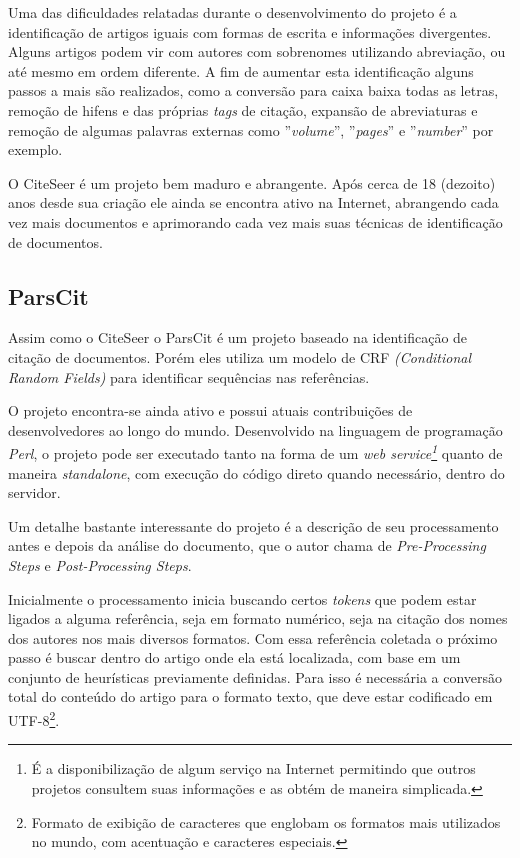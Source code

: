 Uma das dificuldades relatadas durante o desenvolvimento do projeto é a identificação de artigos iguais com formas de escrita e informações divergentes. Alguns artigos podem vir com autores com sobrenomes utilizando abreviação, ou até mesmo em ordem diferente. A fim de aumentar esta identificação alguns passos a mais são realizados, como a conversão para caixa baixa todas as letras, remoção de hifens e das próprias \textit{tags} de citação, expansão de abreviaturas e remoção de algumas palavras externas como ''\textit{volume}'', ''\textit{pages}'' e ''\textit{number}'' por exemplo.

O CiteSeer é um projeto bem maduro e abrangente. Após cerca de 18 (dezoito) anos desde sua criação ele ainda se encontra ativo na Internet, abrangendo cada vez mais documentos e aprimorando cada vez mais suas técnicas de identificação de documentos.

\subsection{ParsCit}
\label{ssec:parscit}

Assim como o CiteSeer o ParsCit é um projeto baseado na identificação de citação de documentos. Porém eles utiliza um modelo de CRF \textit{(Conditional Random Fields)} para identificar sequências nas referências. 

O projeto encontra-se ainda ativo e possui atuais contribuições de desenvolvedores ao longo do mundo. Desenvolvido na linguagem de programação \textit{Perl}, o projeto pode ser executado tanto na forma de um \textit{web service\footnote{É a disponibilização de algum serviço na Internet permitindo que outros projetos consultem suas informações e as obtém de maneira simplicada.}} quanto de maneira \textit{standalone}, com execução do código direto quando necessário, dentro do servidor.

Um detalhe bastante interessante do projeto é a descrição de seu processamento antes e depois da análise do documento, que o autor chama de \textit{Pre-Processing Steps} e \textit{Post-Processing Steps}.

Inicialmente o processamento inicia buscando certos \textit{tokens} que podem estar ligados a alguma referência, seja em formato numérico, seja na citação dos nomes dos autores nos mais diversos formatos. Com essa referência coletada o próximo passo é buscar dentro do artigo onde ela está localizada, com base em um conjunto de heurísticas previamente definidas. Para isso é necessária a conversão total do conteúdo do artigo para o formato texto, que deve estar codificado em UTF-8\footnote{Formato de exibição de caracteres que englobam os formatos mais utilizados no mundo, com acentuação e caracteres especiais.}.

